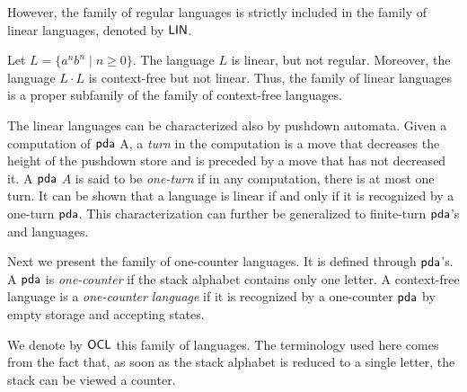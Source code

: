 However, the family of regular languages is strictly included in the family of linear languages, denoted by \index{$\Lin$}$\Lin$.

Let $L = \{a^n b^n \mid n \ge 0\}$. The language $L$ is linear, but not regular. Moreover, the language $L \cdot L$ is context-free but not linear. Thus, the family of linear languages is a proper subfamily of the family of context-free languages. 
%

The linear languages can be characterized also by pushdown automata. Given a computation of \index{$\pda$}$\pda$ A, a \emph{turn} in the computation is a move that decreases the height of the pushdown store and is preceded by a move that has not decreased it. A \index{$\pda$}$\pda$ $A$ is said to be  \emph{one-turn} if in any computation, there is at most one turn. It can be shown that a language is linear if and only if it is recognized by a one-turn $\pda$. This characterization can further be generalized to  finite-turn \index{$\pda$}$\pda$'s and languages.

Next we present the family of one-counter languages. It is defined through \index{$\pda$}$\pda$'s. A \index{$\pda$}$\pda$ is \emph{one-counter} if the stack alphabet contains only one letter. A context-free language is a \emph{one-counter language} if it is recognized by a one-counter \index{$\pda$}$\pda$ by empty storage and accepting states.

We denote by \index{$\Ocl$}$\Ocl$ this family of languages. The terminology used here comes from the fact that, as soon as the stack alphabet is reduced to a single letter, the stack can be viewed a counter.

